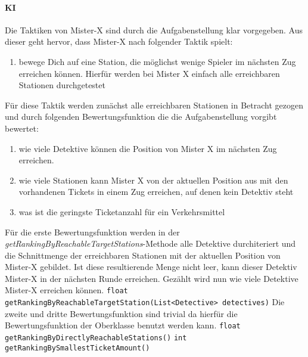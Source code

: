                 \paragraph{KI}
                    Die Taktiken von Mister-X sind durch die Aufgabenstellung klar vorgegeben.
                    Aus dieser geht hervor, dass Mister-X nach folgender Taktik spielt:
                    \begin{enumerate}
                        \item bewege Dich auf eine Station, die möglichst wenige Spieler im nächsten Zug erreichen können. Hierfür werden bei Mister X einfach alle erreichbaren Stationen durchgetestet
                    \end{enumerate}
                    Für diese Taktik werden zunächst alle erreichbaren Stationen in Betracht gezogen und durch folgenden Bewertungsfunktion
                    die die Aufgabenstellung vorgibt bewertet:
                    \begin{enumerate}
                        \item wie viele Detektive können die Position von Mister X im nächsten Zug erreichen.
                        \item wie viele Stationen kann Mister X von der aktuellen Position aus mit den vorhandenen Tickets in einem Zug erreichen, auf denen kein Detektiv steht
                        \item was ist die geringste Ticketanzahl für ein Verkehrsmittel
                    \end{enumerate}
                    Für die erste Bewertungsfunktion werden in der \textit{getRankingByReachableTargetStations}-Methode alle
                    Detektive durchiteriert und die Schnittmenge der erreichbaren Stationen mit der aktuellen Position von Mister-X gebildet.
                    Ist diese resultierende Menge nicht leer, kann dieser Detektiv Mister-X in der nächsten Runde erreichen.
                    Gezählt wird nun wie viele Detektive Mister-X erreichen können.
                    \newline
                    \newline
                    \texttt{float getRankingByReachableTargetStation(List<Detective> detectives)}
                    \newline
                    \newline
                    Die zweite und dritte Bewertungsfunktion sind trivial da hierfür die Bewertungsfunktion der Oberklasse benutzt werden kann.
                    \newline
                    \newline
                    \texttt{float getRankingByDirectlyReachableStations()}
                    \newline
                    \newline
                    \texttt{int getRankingBySmallestTicketAmount()}
                    \newline
                    \newline
